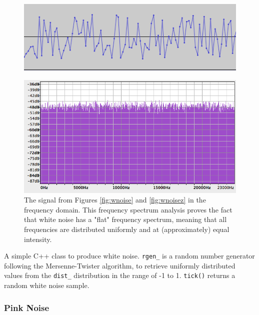 \documentclass[12pt,twoside]{report}
\begin{document}
\begin{figure}[h!]
  {\includegraphics[scale=0.5]{img/wnoisez}}
\end{figure}

\begin{figure}[h!]
  \includegraphics[scale=0.6]{img/wnoisef}
  \caption{The signal from Figures \ref{fig:wnoise} and \ref{fig:wnoisez} in the frequency domain. This frequency spectrum analysis proves the fact that white noise has a "flat" frequency spectrum, meaning that all frequencies are  distributed uniformly and at (approximately) equal intensity. }
  \label{fig:wnoisef}
\end{figure}

\begin{table}
  \caption{A simple C++ class to produce white noise. \texttt{rgen\_} is a random number generator following the Mersenne-Twister algorithm, to retrieve uniformly distributed values from the \texttt{dist\_} distribution in the range of -1 to 1. \texttt{tick()} returns a random white noise sample. }
  \label{code:wnoise}
\end{table}

\subsubsection{Pink Noise}
\end{document}

